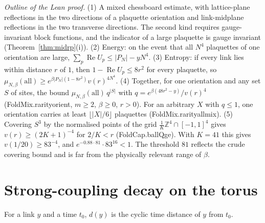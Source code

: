 \documentclass[11pt,a4paper]{article}
\theoremstyle{definition}
\theoremstyle{remark}
\newcommand{\leanus}{\textunderscore\allowbreak{}}
\newcommand{\leandot}{.\allowbreak{}}
\newcommand{\lean}[1]{{\ttfamily\let\_\leanus #1}}
\newcommand{\Z}{\mathbb{Z}}
\renewcommand{\Re}{\operatorname{Re}}
\begin{document}
\emph{Outline of the Lean proof.} (1) A mixed chessboard estimate, with lattice-plane reflections in the two directions of a plaquette orientation and link-midplane reflections in the two transverse directions. The second kind requires gauge-invariant block functions, and the indicator of a large plaquette is gauge invariant (Theorem~\ref{thm:midrp}(i)). (2) Energy: on the event that all $N^4$ plaquettes of one orientation are large, $\sum_p\Re U_p\le|P_N|-yN^4$. (3) Entropy: if every link lies within distance $r$ of $1$, then $1-\Re U_p\le8r^2$ for every plaquette, so $\mu_{N,\beta}(\text{all})\ge e^{\beta|P_N|(1-8r^2)}v(r)^{4N^4}$. (4) Together, for one orientation and any set $S$ of sites, the bound $\mu_{N,\beta}(\text{all})\,q^{|S|}$ with $q=e^{\beta(48r^2-y)}/v(r)^4$ (\lean{FoldMix\leandot{}rarity\_orient}, $m\ge2$, $\beta\ge0$, $r>0$). For an arbitrary $X$ with $q\le1$, one orientation carries at least $\lfloor|X|/6\rfloor$ plaquettes (\lean{FoldMix\leandot{}rarity\_all\_mix}). (5) Covering $S^3$ by the normalised points of the grid $\frac1K\Z^4\cap[-1,1]^4$ gives $v(r)\ge(2K+1)^{-4}$ for $2/K<r$ (\lean{FoldCap\leandot{}ballQ\_ge}). With $K=41$ this gives $v(1/20)\ge83^{-4}$, and $e^{-0.88\cdot81}\cdot83^{16}<1$. The threshold $81$ reflects the crude covering bound and is far from the physically relevant range of $\beta$.

\section{Strong-coupling decay on the torus}\label{sec:dob}

For a link $y$ and a time $t_0$, $d(y)$ is the cyclic time distance of $y$ from $t_0$.
\end{document}
